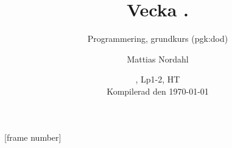 [frame number]


\title[Föreläsning i ''Programmering, grundkurs: dod'', Mattias Nordahl, senast uppdaterad: \today]{Vecka \vecka. \veckotema}
\subtitle{Programmering, grundkurs (pgk:dod)}
\author{Mattias Nordahl}
\date{\CourseCode, Lp1-2, HT\CurrentYear\\{\vspace{1em}\tiny Kompilerad den \today}}


